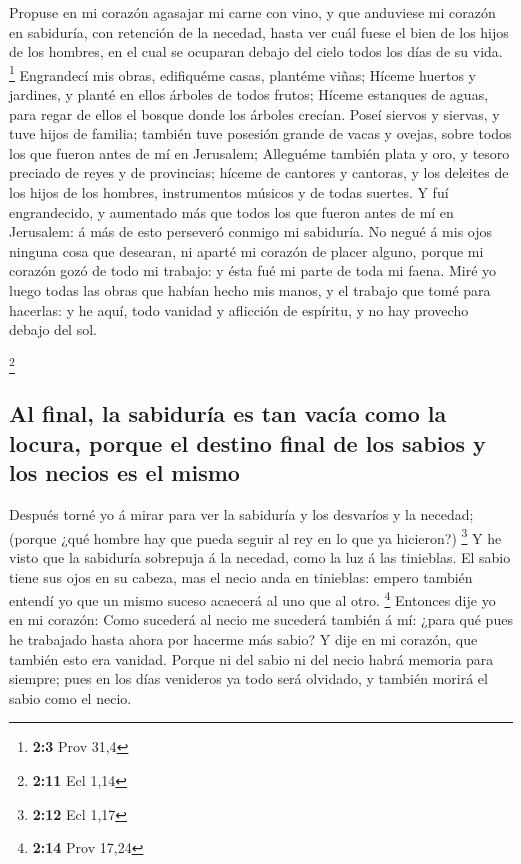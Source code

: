  Propuse en mi corazón agasajar mi carne con vino, y que
anduviese mi corazón en sabiduría, con retención de la necedad, hasta
ver cuál fuese el bien de los hijos de los hombres, en el cual se
ocuparan debajo del cielo todos los días de su vida. \footnote{\textbf{2:3}
  Prov 31,4}  Engrandecí mis obras, edifiquéme casas,
plantéme viñas;  Híceme huertos y jardines, y planté en
ellos árboles de todos frutos;  Híceme estanques de aguas,
para regar de ellos el bosque donde los árboles crecían. 
Poseí siervos y siervas, y tuve hijos de familia; también tuve posesión
grande de vacas y ovejas, sobre todos los que fueron antes de mí en
Jerusalem;  Alleguéme también plata y oro, y tesoro preciado
de reyes y de provincias; híceme de cantores y cantoras, y los deleites
de los hijos de los hombres, instrumentos músicos y de todas suertes.
 Y fuí engrandecido, y aumentado más que todos los que
fueron antes de mí en Jerusalem: á más de esto perseveró conmigo mi
sabiduría.  No negué á mis ojos ninguna cosa que desearan,
ni aparté mi corazón de placer alguno, porque mi corazón gozó de todo mi
trabajo: y ésta fué mi parte de toda mi faena.  Miré yo
luego todas las obras que habían hecho mis manos, y el trabajo que tomé
para hacerlas: y he aquí, todo vanidad y aflicción de espíritu, y no hay
provecho debajo del sol.

\footnote{\textbf{2:11} Ecl 1,14}

\hypertarget{al-final-la-sabiduruxeda-es-tan-vacuxeda-como-la-locura-porque-el-destino-final-de-los-sabios-y-los-necios-es-el-mismo}{%
\subsection{Al final, la sabiduría es tan vacía como la locura, porque
el destino final de los sabios y los necios es el
mismo}\label{al-final-la-sabiduruxeda-es-tan-vacuxeda-como-la-locura-porque-el-destino-final-de-los-sabios-y-los-necios-es-el-mismo}}

 Después torné yo á mirar para ver la sabiduría y los
desvaríos y la necedad; (porque ¿qué hombre hay que pueda seguir al rey
en lo que ya hicieron?) \footnote{\textbf{2:12} Ecl 1,17} 
Y he visto que la sabiduría sobrepuja á la necedad, como la luz á las
tinieblas.  El sabio tiene sus ojos en su cabeza, mas el
necio anda en tinieblas: empero también entendí yo que un mismo suceso
acaecerá al uno que al otro. \footnote{\textbf{2:14} Prov 17,24}
 Entonces dije yo en mi corazón: Como sucederá al necio me
sucederá también á mí: ¿para qué pues he trabajado hasta ahora por
hacerme más sabio? Y dije en mi corazón, que también esto era vanidad.
 Porque ni del sabio ni del necio habrá memoria para
siempre; pues en los días venideros ya todo será olvidado, y también
morirá el sabio como el necio.

